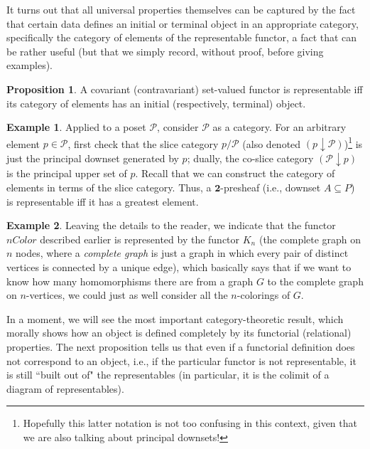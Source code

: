 \documentclass[a4paper]{book}
\theoremstyle{definition}
\newtheorem{example}{Example}[section]
\theoremstyle{definition}
\theoremstyle{definition}
\newtheorem{proposition}{Proposition}[section]
\theoremstyle{theorem}
\theoremstyle{definition}
\begin{document}
It turns out that all universal properties themselves can be captured by the fact that certain data defines an initial or terminal object in an appropriate category, specifically the category of elements of the representable functor, a fact that can be rather useful (but that we simply record, without proof, before giving examples). 
\begin{proposition} \label{representable}
	A covariant (contravariant) set-valued functor is representable iff its category of elements has an initial (respectively, terminal) object.
\end{proposition} 
\begin{example}
	Applied to a poset $\mathcal{P}$, consider $\mathcal{P}$ as a category. For an arbitrary element $p \in \mathcal{P}$, first check that the slice category $p / \mathcal{P}$ (also denoted $(p\downarrow \mathcal{P})$)\footnote{Hopefully this latter notation is not too confusing in this context, given that we are also talking about principal downsets!} is just the principal downset generated by $p$; dually, the co-slice category $(\mathcal{P} \downarrow p)$ is the principal upper set of $p$. Recall that we can construct the category of elements in terms of the slice category. Thus, a $\textbf{2}$-presheaf (i.e., downset $A \subseteq  P$) is representable iff it has a greatest element.  
\end{example}
\begin{example}
	Leaving the details to the reader, we indicate that the functor $nColor$  described earlier is represented by the functor $K_n$ (the complete graph on $n$ nodes, where a \textit{complete graph} is just a graph in which every pair of distinct vertices is connected by a unique edge), which basically says that if we want to know how many homomorphisms there are from a graph $G$ to the complete graph on $n$-vertices, we could just as well consider all the $n$-colorings of $G$.  
\end{example} \noindent 
In a moment, we will see the most important category-theoretic result, which morally shows how an object is defined completely by its functorial (relational) properties. The next proposition tells us that even if a functorial definition does not correspond to an object, i.e., if the particular functor is not representable, it is still ``built out of" the representables (in particular, it is the colimit of a diagram of representables). 
\end{document}
